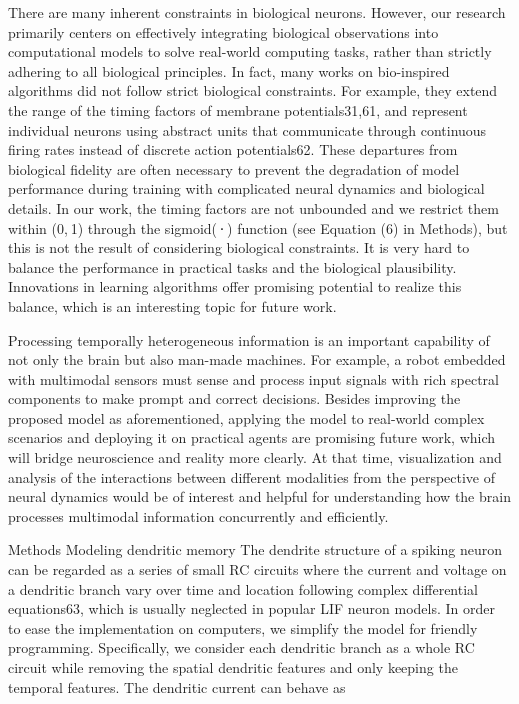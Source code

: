 There are many inherent constraints in biological neurons. However, our research primarily centers on effectively integrating biological observations into computational models to solve real-world computing tasks, rather than strictly adhering to all biological principles. In fact, many works on bio-inspired algorithms did not follow strict biological constraints. For example, they extend the range of the timing factors of membrane potentials31,61, and represent individual neurons using abstract units that communicate through continuous firing rates instead of discrete action potentials62. These departures from biological fidelity are often necessary to prevent the degradation of model performance during training with complicated neural dynamics and biological details. In our work, the timing factors are not unbounded and we restrict them within (0, 1) through the sigmoid( ⋅ ) function (see Equation (6) in Methods), but this is not the result of considering biological constraints. It is very hard to balance the performance in practical tasks and the biological plausibility. Innovations in learning algorithms offer promising potential to realize this balance, which is an interesting topic for future work.

Processing temporally heterogeneous information is an important capability of not only the brain but also man-made machines. For example, a robot embedded with multimodal sensors must sense and process input signals with rich spectral components to make prompt and correct decisions. Besides improving the proposed model as aforementioned, applying the model to real-world complex scenarios and deploying it on practical agents are promising future work, which will bridge neuroscience and reality more clearly. At that time, visualization and analysis of the interactions between different modalities from the perspective of neural dynamics would be of interest and helpful for understanding how the brain processes multimodal information concurrently and efficiently.

Methods
Modeling dendritic memory
The dendrite structure of a spiking neuron can be regarded as a series of small RC circuits where the current 
 and voltage 
 on a dendritic branch vary over time and location following complex differential equations63, which is usually neglected in popular LIF neuron models. In order to ease the implementation on computers, we simplify the model for friendly programming. Specifically, we consider each dendritic branch as a whole RC circuit while removing the spatial dendritic features and only keeping the temporal features. The dendritic current 
 can behave as

